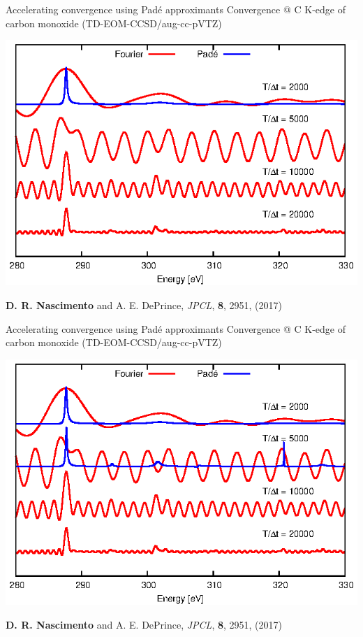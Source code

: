 \documentclass{beamer}
\begin{document}
\begin{frame}{Accelerating convergence using Pad{\'e} approximants}
Convergence @ C K-edge of carbon monoxide (TD-EOM-CCSD/aug-cc-pVTZ)
\begin{center}
 \includegraphics[scale=1.0]{figures/pade_anim_1.eps}
\end{center}
\footnotesize{{\bf D. R. Nascimento} and A. E. DePrince, {\it JPCL}, {\bf 8}, 2951, (2017)} 
\end{frame}

\begin{frame}{Accelerating convergence using Pad{\'e} approximants}
Convergence @ C K-edge of carbon monoxide (TD-EOM-CCSD/aug-cc-pVTZ)
\begin{center}
 \includegraphics[scale=1.0]{figures/pade_anim_2.eps}
\end{center}
\footnotesize{{\bf D. R. Nascimento} and A. E. DePrince, {\it JPCL}, {\bf 8}, 2951, (2017)} 
\end{frame}
\end{document}
